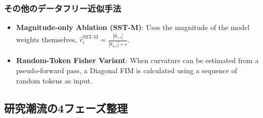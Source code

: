 \documentclass{article}
\begin{document}
\subsubsection{その他のデータフリー近似手法}

\begin{itemize}
    \item \textbf{Magnitude-only Ablation (SST-M)}: Uses the magnitude of the model weights themselves, $\hat{r}_i^{\text{SST-M}} = \frac{|\theta_{s,i}|}{|\theta_{u,i}| + \epsilon}$.
    \item \textbf{Random-Token Fisher Variant}: When curvature can be estimated from a pseudo-forward pass, a Diagonal FIM is calculated using a sequence of random tokens as input.
\end{itemize}

\subsection{研究潮流の4フェーズ整理}

\end{document}
